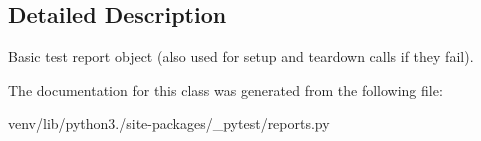 \subsection{Detailed Description}
\begin{DoxyVerb}Basic test report object (also used for setup and teardown calls if
they fail).
\end{DoxyVerb}
 

The documentation for this class was generated from the following file\+:\begin{DoxyCompactItemize}
\item 
venv/lib/python3./site-\/packages/\+\_\+pytest/reports.\+py\end{DoxyCompactItemize}
